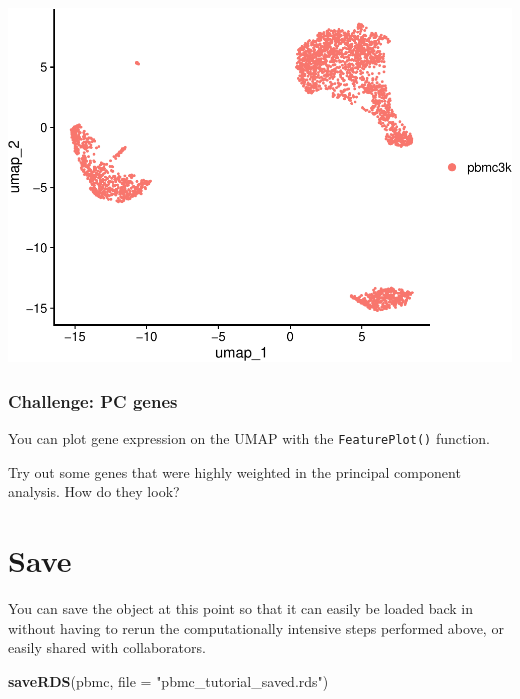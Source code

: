 \documentclass[
]{book}
\newenvironment{Shaded}{\begin{snugshade}}{\end{snugshade}}
\newcommand{\AttributeTok}[1]{\textcolor[rgb]{0.13,0.29,0.53}{#1}}
\newcommand{\FunctionTok}[1]{\textcolor[rgb]{0.13,0.29,0.53}{\textbf{#1}}}
\newcommand{\NormalTok}[1]{#1}
\newcommand{\StringTok}[1]{\textcolor[rgb]{0.31,0.60,0.02}{#1}}
\begin{document}
\includegraphics{scRNAseqInR_Doco_files/figure-latex/tsneplot-1.pdf}

\hypertarget{challenge-pc-genes}{%
\subsubsection*{Challenge: PC genes}\label{challenge-pc-genes}}

You can plot gene expression on the UMAP with the \texttt{FeaturePlot()} function.

Try out some genes that were highly weighted in the principal component analysis. How do they look?

\hypertarget{section-7}{%
\subsubsection*{}\label{section-7}}

\hypertarget{save}{%
\section{Save}\label{save}}

You can save the object at this point so that it can easily be loaded back in without having to rerun the computationally intensive steps performed above, or easily shared with collaborators.

\begin{Shaded}
\begin{Highlighting}[]
\FunctionTok{saveRDS}\NormalTok{(pbmc, }\AttributeTok{file =} \StringTok{"pbmc\_tutorial\_saved.rds"}\NormalTok{) }
\end{Highlighting}
\end{Shaded}
\end{document}
